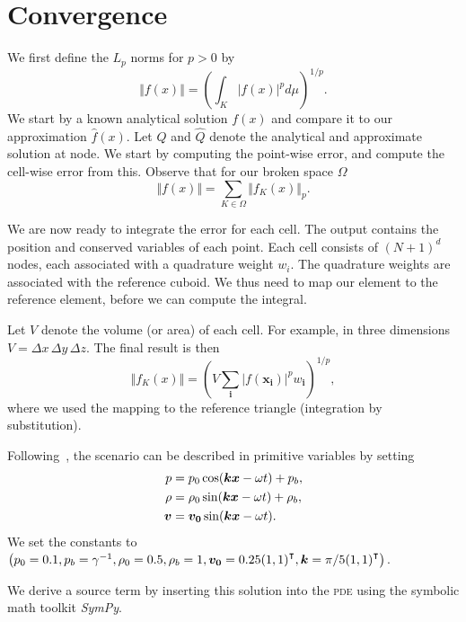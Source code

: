 \section{Convergence}
We first define the $L_p$ norms for $p > 0$ by
\begin{equation}
  \label{eq:Lp-nrom}
  \Vert f(x) \Vert = \left( \int_K \vert f(x) \vert^p d\mu  \right)^{1/p}.
\end{equation}
We start by a known analytical solution $f(x)$ and compare it to our approximation $\hat{f}(x)$.
Let $Q$ and $\hat{Q}$ denote the analytical and approximate solution at node.
We start by computing the point-wise error, and compute the cell-wise error from this.
Observe that for our broken space $\Omega$
\begin{equation}
  \label{eq:lp-norm-broken}
 \Vert f(x) \Vert = \sum_{K \in \Omega} \Vert f_K(x) \Vert_p.
\end{equation}

We are now ready to integrate the error for each cell.
The output contains the position and conserved variables of each point.
Each cell consists of $(N + 1)^d$ nodes, each associated with a quadrature weight $w_i$.
The quadrature weights are associated with the reference cuboid.
We thus need to map our element to the reference element, before we can compute the integral.

Let $V$ denote the volume (or area) of each cell.
For example, in three dimensions $V = \Delta x \, \Delta y \, \Delta z$.
The final result is then
\begin{equation}
  \Vert f_K(x) \Vert = \left( V \sum_{\bm{i}} \vert f(\bm{x}_{\bm{i}}) \vert^p w_{{\bm{i}}}  \right)^{1/p},
\end{equation}
where we used the mapping to the reference triangle (integration by substitution).

Following~\cite{dumbser2010arbitrary}, the scenario can be described in primitive variables by setting
\begin{align}
  p &= p_0 \cos( \bm{k} \bm{x} - \omega t ) + p_b, \\
  \rho &= \rho_0 \sin (\bm{k} \bm{x} - \omega t) + \rho_b, \\
  \bm{v} &= \bm{v_0} \sin(\bm{k} \bm{x} - \omega t).
\end{align}
We set the constants to \( \left(  p_0 = 0.1, p_b = \gamma^{-1}, \rho_0 = 0.5, \rho_b = 1, 
\bm{v_0} = 0.25 {(1,1)}^\intercal, \bm{k} = \pi/5 {(1,1)}^\intercal \right) \).

We derive a source term by inserting this solution into the \textsc{pde} using the symbolic math toolkit \textit{SymPy}.

